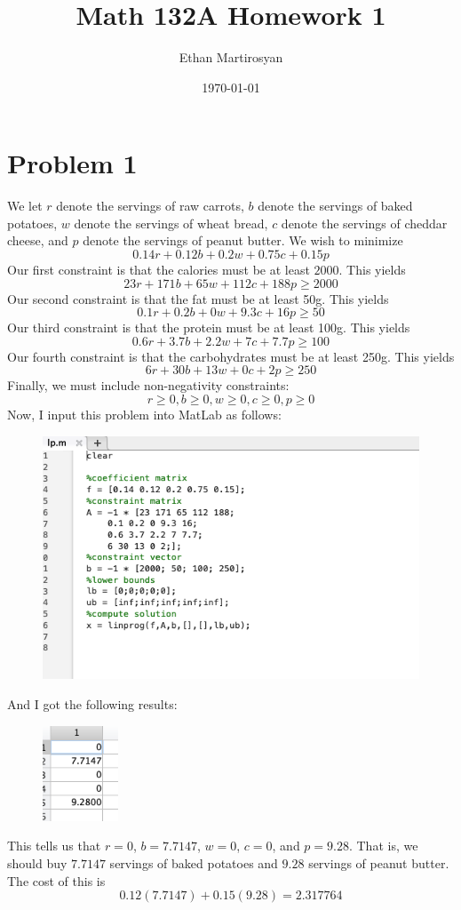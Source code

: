 \documentclass[12pt]{article}
\begin{document}
 
\title{Math 132A Homework 1}
\author{Ethan Martirosyan}
\date{\today}
\maketitle
{}
\hfuzz=50pt
\section*{Problem 1}
We let $r$ denote the servings of raw carrots, $b$ denote the servings of baked potatoes, $w$ denote the servings of wheat bread, $c$ denote the servings of cheddar cheese, and $p$ denote the servings of peanut butter. We wish to minimize
\[
0.14r + 0.12b + 0.2w + 0.75c + 0.15p
\] Our first constraint is that the calories must be at least $2000$. This yields
\[
23r + 171b + 65w + 112c + 188p \geq 2000
\] Our second constraint is that the fat must be at least 50g. This yields
\[
0.1r + 0.2b + 0w + 9.3c + 16p \geq 50
\] Our third constraint is that the protein must be at least 100g. This yields 
\[
0.6r + 3.7b + 2.2w + 7c + 7.7p \geq 100
\] Our fourth constraint is that the carbohydrates must be at least 250g. This yields
\[
6r + 30b +13w + 0c + 2p \geq 250
\] Finally, we must include non-negativity constraints:
\[
r \geq 0, b \geq 0, w \geq 0, c \geq 0, p \geq 0
\]
Now, I input this problem into MatLab as follows:
\begin{figure}[H]
\centering
\includegraphics[width=\textwidth]{matlab}
\end{figure}
And I got the following results:
\begin{figure}[H]
\centering
\includegraphics[width=0.2\textwidth]{results}
\end{figure} This tells us that $r = 0$, $b = 7.7147$, $w = 0$, $c = 0$, and $p = 9.28$. That is, we should buy $7.7147$ servings of baked potatoes and $9.28$ servings of peanut butter. The cost of this is 
\[
0.12(7.7147) + 0.15(9.28) = 2.317764
\]
\newpage
\end{document}
